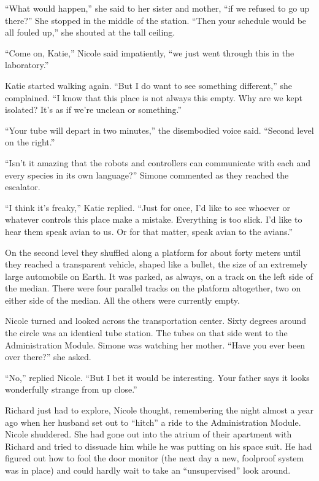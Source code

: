 \documentclass[]{article}
\begin{document}
{“What would happen,” she said to her sister and mother, “if we refused to go up there?” She stopped in the middle of the station.  “Then your schedule would be all fouled up,” she shouted at the tall ceiling.

“Come on, Katie,” Nicole said impatiently, “we just went through this in the laboratory.”

Katie started walking again.  “But I do want to see something different,” she complained.  “I know that this place is not always this empty.  Why are we kept isolated? It’s as if we’re unclean or something.”

“Your tube will depart in two minutes,” the disembodied voice said.  “Second level on the right.”

“Isn’t it amazing that the robots and controllers can communicate with each and every species in its own language?” Simone commented as they reached the escalator.

“I think it’s freaky,” Katie replied.  “Just for once, I’d like to see whoever or whatever controls this place make a mistake.  Everything is too slick.  I’d like to hear them speak avian to us.  Or for that matter, speak avian to the avians.”

On the second level they shuffled along a platform for about forty meters until they reached a transparent vehicle, shaped like a bullet, the size of an extremely large automobile on Earth.  It was parked, as always, on a track on the left side of the median.  There were four parallel tracks on the platform altogether, two on either side of the median.  All the others were currently empty.

Nicole turned and looked across the transportation center.  Sixty degrees around the circle was an identical tube station.  The tubes on that side went to the Administration Module.  Simone was watching her mother.  “Have you ever been over there?” she asked.

“No,” replied Nicole.  “But I bet it would be interesting.  Your father says it looks wonderfully strange from up close.”

Richard just had to explore, Nicole thought, remembering the night almost a year ago when her husband set out to “hitch” a ride to the Administration Module.  Nicole shuddered.  She had gone out into the atrium of their apartment with Richard and tried to dissuade him while he was putting on his space suit.  He had figured out how to fool the door monitor (the next day a new, foolproof system was in place) and could hardly wait to take an “unsupervised” look around.

}
\end{document}
